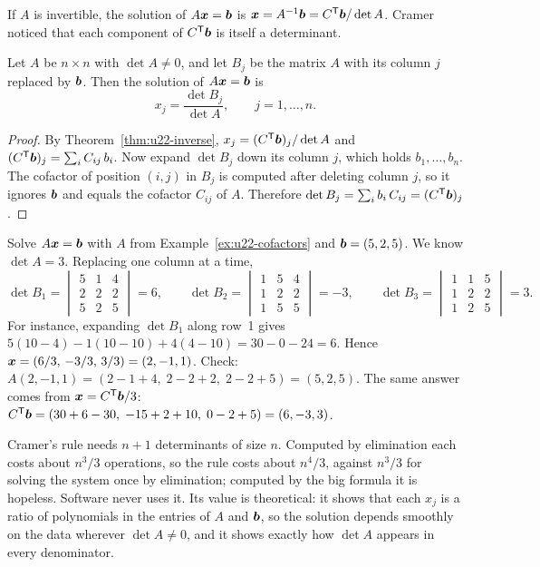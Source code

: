 If $A$ is invertible, the solution of $A\boldsymbol{x}=\boldsymbol{b}$ is
$\boldsymbol{x}=A^{-1}\boldsymbol{b}=C^{\mathsf{T}}\boldsymbol{b}/\det A$. Cramer noticed that each component of $C^{\mathsf{T}}\boldsymbol{b}$ is
itself a determinant.

\begin{theorem}\label{thm:u22-cramer}
Let $A$ be $n\times n$ with $\det A\neq 0$, and let $B_j$ be the matrix $A$ with its column
$j$ replaced by $\boldsymbol{b}$. Then the solution of $A\boldsymbol{x}=\boldsymbol{b}$ is
\[
  x_j=\frac{\det B_j}{\det A},\qquad j=1,\dots,n.
\]
\end{theorem}

\begin{proof}
By Theorem~\ref{thm:u22-inverse}, $x_j=(C^{\mathsf{T}}\boldsymbol{b})_j/\det A$ and
$(C^{\mathsf{T}}\boldsymbol{b})_j=\sum_{i} C_{ij}\,b_i$. Now expand $\det B_j$ down its column $j$, which holds
$b_1,\dots,b_n$. The cofactor of position $(i,j)$ in $B_j$ is computed after deleting
column $j$, so it ignores $\boldsymbol{b}$ and equals the cofactor $C_{ij}$ of $A$. Therefore
$\det B_j=\sum_i b_i\,C_{ij}=(C^{\mathsf{T}}\boldsymbol{b})_j$.
\end{proof}

\begin{example}\label{ex:u22-cramer}
Solve $A\boldsymbol{x}=\boldsymbol{b}$ with $A$ from Example~\ref{ex:u22-cofactors} and
$\boldsymbol{b}=(5,2,5)$. We know $\det A=3$. Replacing one column at a time,
\[
  \det B_1=\begin{vmatrix} 5&1&4\\ 2&2&2\\ 5&2&5\end{vmatrix}=6,\qquad
  \det B_2=\begin{vmatrix} 1&5&4\\ 1&2&2\\ 1&5&5\end{vmatrix}=-3,\qquad
  \det B_3=\begin{vmatrix} 1&1&5\\ 1&2&2\\ 1&2&5\end{vmatrix}=3 .
\]
For instance, expanding $\det B_1$ along row~1 gives
$5(10-4)-1(10-10)+4(4-10)=30-0-24=6$. Hence
$\boldsymbol{x}=(6/3,\,-3/3,\,3/3)=(2,-1,1)$. Check: $A(2,-1,1)=(2-1+4,\;2-2+2,\;2-2+5)=(5,2,5)$.
The same answer comes from $\boldsymbol{x}=C^{\mathsf{T}}\boldsymbol{b}/3$:
$C^{\mathsf{T}}\boldsymbol{b}=(30+6-30,\;-15+2+10,\;0-2+5)=(6,-3,3)$.
\end{example}

\begin{remark}
Cramer's rule needs $n+1$ determinants of size $n$. Computed by elimination each costs about
$n^{3}/3$ operations, so the rule costs about $n^{4}/3$, against $n^{3}/3$ for solving the
system once by elimination; computed by the big formula it is hopeless. Software never uses
it. Its value is theoretical: it shows that each $x_j$ is a ratio of polynomials in the
entries of $A$ and $\boldsymbol{b}$, so the solution depends smoothly on the data wherever
$\det A\neq 0$, and it shows exactly how $\det A$ appears in every denominator.
\end{remark}

